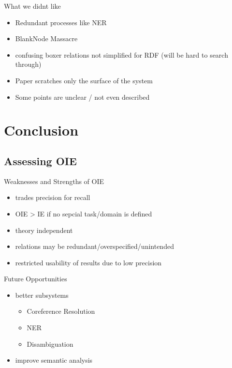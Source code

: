 \documentclass[11pt]{beamer}
\begin{document}
		\begin{frame}{What we didnt like}
			\begin{itemize}
				\item<1-5> Redundant processes like NER
				\item<2-5> BlankNode Massacre
				\item<3-5> confusing boxer relations not simplified for RDF (will be hard to search through)
				
				\vspace{15pt}
				
				\item<4-5> Paper scratches only the surface of the system
				\item<5> Some points are unclear / not even described
			\end{itemize}
		\end{frame}
\section{Conclusion}
	\subsection{Assessing OIE}
	\begin{frame}{Weaknesses and Strengths of OIE}
		\begin{itemize}
			\item<1-5> trades precision for recall
			\item<2-5> OIE > IE if no sepcial task/domain is defined
			\item<3-5> theory independent
			\item<4-5> relations may be redundant/overspecified/unintended
			\item<5> restricted usability of results due to low precision
		\end{itemize}
	\end{frame}
	\begin{frame}{Future Opportunities}
		\begin{itemize}
			\item<1-5> better subsystems\\
				\begin{itemize}
					\item<2-5> Coreference Resolution
					\item<3-5> NER
					\item<4-5> Disambiguation
				\end{itemize}
			\item<5> improve semantic analysis
		\end{itemize}
	\end{frame}
	
\end{document}
